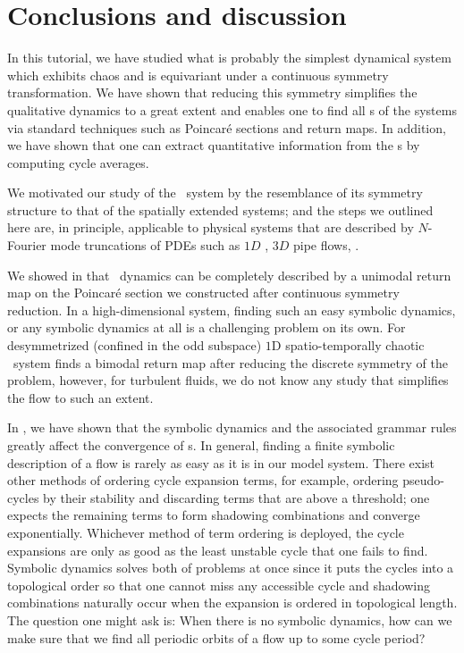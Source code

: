 \section{Conclusions and discussion}
\label{s:concl}

In this tutorial, we have studied what is probably the simplest dynamical system which
exhibits chaos and is equivariant under a continuous symmetry transformation.
We have shown that reducing this symmetry simplifies the qualitative dynamics
to a great extent and enables one to find all \rpo s of the systems via
standard techniques such as Poincar\'e sections and return maps. In
addition, we have shown that one can extract quantitative information
from the \rpo s by computing cycle averages.

We motivated our study of the \twomode\ system by the resemblance of its
symmetry structure to that of the spatially extended systems; and the
steps we outlined here are, in principle, applicable to physical systems
that are described by $N$-Fourier mode truncations of PDEs such as $1D$
\KS{}, $3D$ pipe flows, \etc.

We showed in  that \twomode\ dynamics can be 
completely described by a unimodal return map on the Poincar\'e 
section we constructed after continuous symmetry reduction. In a 
high-dimensional system, finding such an easy symbolic dynamics, 
or any symbolic dynamics at all is a challenging problem on its 
own. For desymmetrized (confined in the odd subspace) $1$D 
spatio-temporally chaotic \KS\ system  finds a 
bimodal return map after reducing the discrete symmetry of the 
problem, however, for turbulent fluids, we do not know any study 
that simplifies the flow to such an extent.

In , we have shown that the symbolic dynamics and the
associated grammar rules greatly affect the convergence of \cycForm s.
In general, finding a finite symbolic description of a flow is
rarely as easy as it is in our model system.
There exist other methods of ordering cycle
expansion terms, for example, ordering pseudo-cycles by their stability and discarding terms
that are above a threshold; one expects the remaining terms to form
shadowing combinations and converge exponentially.
Whichever method of term ordering is deployed, the cycle expansions are only as good
as the least unstable cycle that one fails to find. Symbolic dynamics solves both
of problems at once since it puts the cycles into a topological order so that
one cannot miss any accessible cycle and shadowing combinations naturally occur
when the expansion is ordered in topological length. The question one might ask
is: When there is no symbolic dynamics, how can we make sure that we find all
periodic orbits of a flow up to some cycle period?

